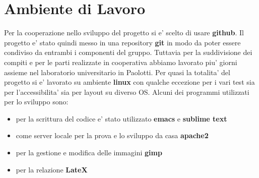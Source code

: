 \section{Ambiente di Lavoro}

Per la cooperazione nello sviluppo del progetto si e' scelto di usare \textbf{github}. 
Il progetto e' stato quindi messo in una repository \textbf{git} in modo da poter essere condiviso da entrambi i componenti del gruppo.
Tuttavia per la suddivisione dei compiti e per le parti realizzate in cooperativa abbiamo lavorato piu' giorni assieme nel laboratorio universitario in Paolotti.
Per quasi la totalita' del progetto si e' lavorato su ambiente \textbf{linux} con qualche eccezione per i vari test sia per l'accessibilita' sia per layout su diverso OS.
Alcuni dei programmi utilizzati per lo sviluppo sono:
\begin{itemize}
	\item	per la scrittura del codice e' stato utilizzato \textbf{emacs} e \textbf{sublime text}
	\item come server locale per la prova e lo sviluppo da casa \textbf{apache2}
	\item per la gestione e modifica delle immagini \textbf{gimp}
	\item per la relazione \textbf{LateX}
\end{itemize}
\nopagebreak[3]
